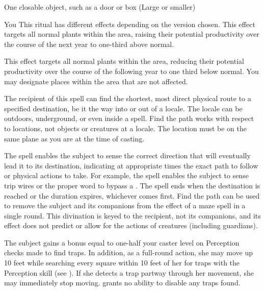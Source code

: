 \begin{spelltarget}{One closable object, such as a door or box (Large or smaller)}
\begin{spelltarget}{You}
\spelleffect This ritual has different effects depending on the version chosen.
 This effect targets all normal plants within the area, raising their potential productivity over the course of the next year to one-third above normal.
\par {} This effect targets all normal plants within the area, reducing their potential productivity over the course of the following year to one third below normal.
\spellnotes You may designate places within the area that are not affected.

\spelldur{\durext \dismissable}
\spelleffect The recipient of this spell can find the shortest, most direct physical route to a specified destination, be it the way into or out of a locale. The locale can be outdoors, underground, or even inside a  spell. Find the path works with respect to locations, not objects or creatures at a locale. The location must be on the same plane as you are at the time of casting.
\par The spell enables the subject to sense the correct direction that will eventually lead it to its destination, indicating at appropriate times the exact path to follow or physical actions to take. For example, the spell enables the subject to sense trip wires or the proper word to bypass a . The spell ends when the destination is reached or the duration expires, whichever comes first. Find the path can be used to remove the subject and its companions from the effect of a maze spell in a single round.
\spellnotes This divination is keyed to the recipient, not its companions, and its effect does not predict or allow for the actions of creatures (including guardians).

\spelldur{\durmed}
\spelleffect The subject gains a bonus equal to one-half your caster level on Perception checks made to find traps. In addition, as a full-round action, she may move up 10 feet while searching every square within 10 feet of her for traps with the Perception skill (see ). If she detects a trap partway through her movement, she may immediately stop moving.
\spellnotes {} grants no ability to disable any traps found.


\end{spelltarget}
\end{spelltarget}
